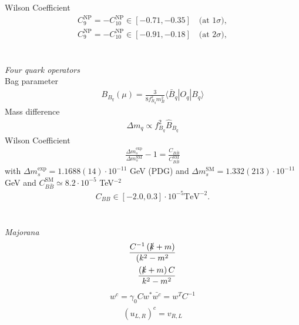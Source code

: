 Wilson Coefficient \cite{150306199}
\begin{align}
 C_9^\text{NP} = -C_{10}^\text{NP} \in [-0.71,-0.35]\quad \text{(at 1}\sigma),\\
 C_9^\text{NP} = -C_{10}^\text{NP} \in [-0.91,-0.18]\quad \text{(at 2}\sigma),
\end{align}
\\ \\ \textit{Four quark operators}\\
Bag parameter \cite{1607.00299}
\begin{align}
 B_{B_q}(\mu) = \frac{3}{8f_{B_q}^2 m_B^2} \langle \bar B_q |O_q|B_q \rangle
\end{align}
Mass difference \cite{1102.0009}
\begin{align}
 \Delta m_q \propto f^2_{B_q} \hat{B}_{B_q}
\end{align}
Wilson Coefficient
\begin{align}
 \frac{\Delta m_s^\text{exp}}{\Delta m_s^\text{SM}}-1 = \frac{C_{B\bar B}}{C^\text{SM}_{B\bar B}}
\end{align}
with $\Delta m_s^\text{exp} = 1.1688(14) \cdot 10^{-11}$ GeV (PDG) \cite{1602.03560} and $\Delta m_s^\text{SM} = 1.332(213)\cdot 10^{-11}$ GeV \cite{0612167}%
and $C_{B\bar B}^\text{SM} \simeq 8.2\cdot 10^{-5}$ TeV$^{-2}$ 
\begin{align}
 C_{BB} \in [-2.0,0.3] \cdot 10^{-5} \text{TeV}^{-2}.%
\end{align}
\\ \\ \textit{Majorana}\\
\begin{equation}
\begin{aligned}
 \frac{C^{-1}\left(\slashed{k}+m\right)}{(k^2-m^2}\\
 \frac{\left(\slashed{k}+m\right)C}{k^2-m^2}
\end{aligned}
\label{eq_majoProp}
\end{equation}
\begin{equation}
\begin{aligned}
 w^c = \gamma_0 C w^*
 \bar {w^c}= w^T C^{-1}
\end{aligned}
\label{eq_ChargeConj}
\end{equation}
\cite{Fierz}
\begin{align}
 \left(u_{L,R}\right)^c = v_{R,L}
\end{align}



